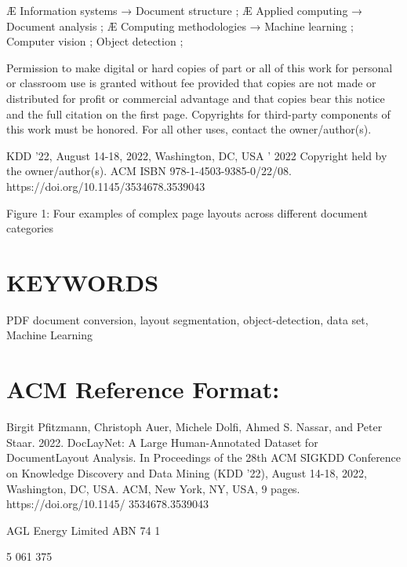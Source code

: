 \documentclass[11pt,a4paper]{article}
\begin{document}
Æ Information systems → Document structure ; Æ Applied computing → Document analysis ; Æ Computing methodologies → Machine learning ; Computer vision ; Object detection ;

Permission to make digital or hard copies of part or all of this work for personal or classroom use is granted without fee provided that copies are not made or distributed for profit or commercial advantage and that copies bear this notice and the full citation on the first page. Copyrights for third-party components of this work must be honored. For all other uses, contact the owner/author(s).

KDD '22, August 14-18, 2022, Washington, DC, USA ' 2022 Copyright held by the owner/author(s). ACM ISBN 978-1-4503-9385-0/22/08. https://doi.org/10.1145/3534678.3539043

Figure 1: Four examples of complex page layouts across different document categories

\section{KEYWORDS}

PDF document conversion, layout segmentation, object-detection, data set, Machine Learning

\section{ACM Reference Format:}

Birgit Pfitzmann, Christoph Auer, Michele Dolfi, Ahmed S. Nassar, and Peter Staar. 2022. DocLayNet: A Large Human-Annotated Dataset for DocumentLayout Analysis. In Proceedings of the 28th ACM SIGKDD Conference on Knowledge Discovery and Data Mining (KDD '22), August 14-18, 2022, Washington, DC, USA. ACM, New York, NY, USA, 9 pages. https://doi.org/10.1145/ 3534678.3539043

\begin{figure}[h]
\end{figure}

\begin{figure}[h]
\end{figure}

AGL Energy Limited  ABN 74 1

5 061 375

\begin{figure}[h]
\end{figure}
\end{document}
